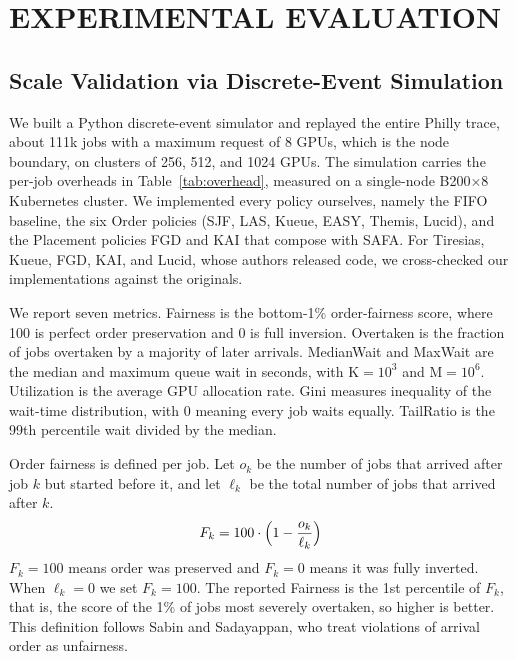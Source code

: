 \documentclass{ieeetj}
\begin{document}
\section{EXPERIMENTAL EVALUATION}\label{sec:eval}

\subsection{Scale Validation via Discrete-Event Simulation}\label{eval:sim}
We built a Python discrete-event simulator and replayed the entire Philly trace\cite{jeon2019philly}, about 111k jobs with a maximum request of 8 GPUs, which is the node boundary, on clusters of 256, 512, and 1024 GPUs. The simulation carries the per-job overheads in Table~\ref{tab:overhead}, measured on a single-node B200$\times$8 Kubernetes cluster. We implemented every policy ourselves, namely the FIFO baseline, the six Order policies (SJF, LAS, Kueue, EASY, Themis, Lucid), and the Placement policies FGD and KAI that compose with SAFA. For Tiresias, Kueue, FGD, KAI, and Lucid, whose authors released code, we cross-checked our implementations against the originals.

\begin{table}[htb!]
\centering
\caption{Per-job lifecycle overhead}
\label{tab:overhead}
\small
{}
\end{table}

\noindent We report seven metrics. Fairness is the bottom-1\% order-fairness score, where 100 is perfect order preservation and 0 is full inversion. Overtaken is the fraction of jobs overtaken by a majority of later arrivals. MedianWait and MaxWait are the median and maximum queue wait in seconds, with K$=10^3$ and M$=10^6$. Utilization is the average GPU allocation rate. Gini measures inequality of the wait-time distribution, with 0 meaning every job waits equally. TailRatio is the 99th percentile wait divided by the median.

Order fairness is defined per job. Let $o_k$ be the number of jobs that arrived after job $k$ but started before it, and let $\ell_k$ be the total number of jobs that arrived after $k$.
\begin{equation}
F_k = 100\cdot\Bigl(1 - \frac{o_k}{\ell_k}\Bigr)
\label{eq:order-fair}
\end{equation}
$F_k=100$ means order was preserved and $F_k=0$ means it was fully inverted. When $\ell_k=0$ we set $F_k=100$. The reported Fairness is the 1st percentile of $F_k$, that is, the score of the 1\% of jobs most severely overtaken, so higher is better. This definition follows Sabin and Sadayappan\cite{sabin2005unfairness}, who treat violations of arrival order as unfairness.
\end{document}

